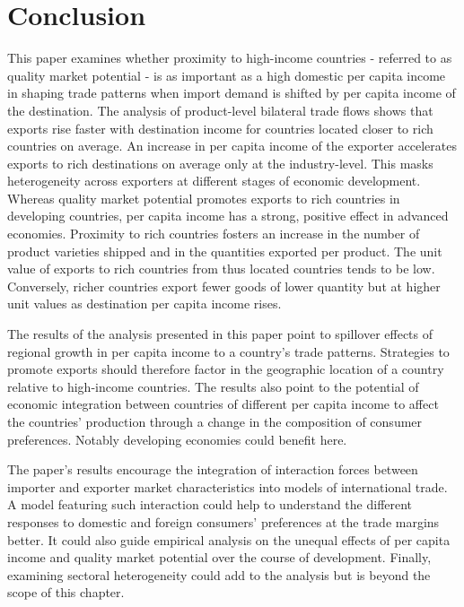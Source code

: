 \documentclass[12pt,a4paper,oneside,times]{article}   	%
\newcommand{\tablespath}{{"C:/Users/dhill/Dropbox/Dissertation"}}
\DeclareMathOperator{\MP}{QMP}
\begin{document}
%

%

\section{Conclusion}\label{s: conclusion}

This paper examines whether proximity to high-income countries - referred to as quality market potential - is as important as a high domestic per capita income in shaping trade patterns when import demand is shifted by per capita income of the destination. The analysis of product-level bilateral trade flows shows that exports rise faster with destination income for countries located closer to rich countries on average. An increase in per capita income of the exporter accelerates exports to rich destinations on average only at the industry-level. This masks heterogeneity across exporters at different stages of economic development. Whereas quality market potential promotes exports to rich countries in developing countries, per capita income has a strong, positive effect in advanced economies. Proximity to rich countries fosters an increase in the number of product varieties shipped and in the quantities exported per product. The unit value of exports to rich countries from thus located countries tends to be low. Conversely, richer countries export fewer goods of lower quantity but at higher unit values as destination per capita income rises. 

The results of the analysis presented in this paper point to spillover effects of regional growth in per capita income to a country's trade patterns. Strategies to promote exports should therefore factor in the geographic location of a country relative to high-income countries. The results also point to the potential of economic integration between countries of different per capita income to affect the countries' production through a change in the composition of consumer preferences. Notably developing economies could benefit here.

The paper's results encourage the integration of interaction forces between importer and exporter market characteristics into models of international trade. A model featuring such interaction could help to understand the different responses to domestic and foreign consumers' preferences at the trade margins better. It could also guide empirical analysis on the unequal effects of per capita income and quality market potential over the course of development. Finally, examining sectoral heterogeneity could add to the analysis but is beyond the scope of this chapter.
\end{document}
